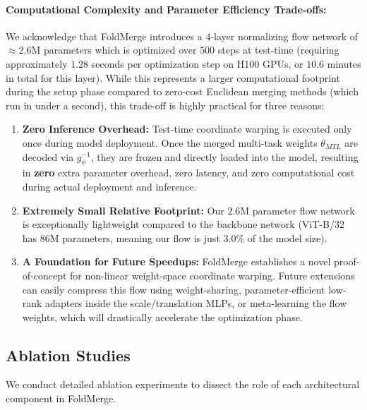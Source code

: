 \paragraph{Computational Complexity and Parameter Efficiency Trade-offs:}
We acknowledge that FoldMerge introduces a 4-layer normalizing flow network of $\approx 2.6\text{M}$ parameters which is optimized over $500$ steps at test-time (requiring approximately $1.28$ seconds per optimization step on H100 GPUs, or $10.6$ minutes in total for this layer). 
While this represents a larger computational footprint during the setup phase compared to zero-cost Euclidean merging methods (which run in under a second), this trade-off is highly practical for three reasons:
\begin{enumerate}
  \item \textbf{Zero Inference Overhead:} Test-time coordinate warping is executed only once during model deployment. Once the merged multi-task weights $\theta_{MTL}$ are decoded via $g_\phi^{-1}$, they are frozen and directly loaded into the model, resulting in \textbf{zero} extra parameter overhead, zero latency, and zero computational cost during actual deployment and inference.
  \item \textbf{Extremely Small Relative Footprint:} Our $2.6\text{M}$ parameter flow network is exceptionally lightweight compared to the backbone network (ViT-B/32 has $86\text{M}$ parameters, meaning our flow is just $3.0\%$ of the model size).
  \item \textbf{A Foundation for Future Speedups:} FoldMerge establishes a novel proof-of-concept for non-linear weight-space coordinate warping. Future extensions can easily compress this flow using weight-sharing, parameter-efficient low-rank adapters inside the scale/translation MLPs, or meta-learning the flow weights, which will drastically accelerate the optimization phase.
\end{enumerate}

\subsection{Ablation Studies}
We conduct detailed ablation experiments to dissect the role of each architectural component in FoldMerge.

